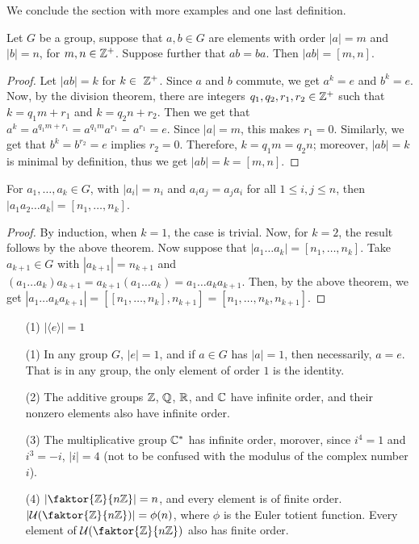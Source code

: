 We conclude the section with more examples and one last definition.

\begin{lemma}\label{1.2.5}
  Let $G$ be a group, suppose that  $a,b \in G$ are elements with
  order $|a|=m$ and  $|b|=n$, for  $m,n \in \mathbb{Z}^+$. Suppose further
  that $ab=ba$. Then  $|ab|=[m,n]$.
\end{lemma}
\begin{proof}
  Let $|ab|=k$ for $k \in \ \mathbb{Z}^+$. Since  $a$ and  $b$ commute, we get
  $a^k=e$ and  $b^k=e$. Now, by the division theorem, there are integers
  $q_1,q_2,r_1,r_2 \in \mathbb{Z}^+$ such that $k=q_1m+r_1$ and $k=q_2n+r_2$. Then we
  get that $a^k=a^{q_1m+r_1}=a^{q_1m}a^{r_1}=a^{r_1}=e$. Since $|a|=m$,
  this makes $r_1=0$. Similarly, we get that $b^k=b^{r_2}=e$ implies $r_2=0$.
  Therefore, $k=q_1m=q_2n$; moreover, $|ab|=k$ is minimal by definition,
  thus we get $|ab|=k=[m,n]$.
\end{proof}
\begin{corollary}
  For $a_1, \dots, a_k \in G$, with $|a_i|=n_i$ and $a_ia_j=a_ja_i$ for
  all  $1 \leq i,j \leq n$, then  $|a_1a_2 \dots a_k|=[n_1, \dots, n_k]$.
\end{corollary}
\begin{proof}
  By induction, when $k=1$, the case is trivial. Now, for  $k=2$, the result
  follows by the above theorem. Now suppose that $|a_1 \dots a_k|=[n_1,
  \dots, n_k]$. Take $a_{k+1} \in G$ with $|a_{k+1}|=n_{k+1}$ and $(a_1
  \dots a_k)a_{k+1}=a_{k+1}(a_1 \dots a_k)=a_1 \dots a_ka_{k+1}$. Then, by the
  above theorem, we get $|a_1 \dots a_ka_{k+1}|=[[n_1, \dots, n_k],
  n_{k+1}]=[n_1, \dots, n_k, n_{k+1}]$.
\end{proof}

\begin{example}
  \begin{enumerate}
    \item[(1)] $|\langle e \rangle|=1$
    \item[(1)] In any group $G$,  $|e|=1$, and if $a \in G$ has
      $|a|=1$, then necessarily, $a=e$. That is in any group, the only
      element of order  $1$ is the identity.

    \item[(2)] The additive groups $\mathbb{Z}$,  $\mathbb{Q}$,  $\mathbb{R}$, and  $\mathbb{C}$ have
      infinite order, and their nonzero elements also have infinite order.

    \item[(3)] The multiplicative group $\mathbb{C}^*$ has infinite order, morover,
      since $i^4=1$ and $i^3=-i$, $|i|=4$ (not to be confused with the
      modulus of the complex number $i$).

    \item[(4)] $|\faktor{\Z}{n\Z}|=n$, and every element is of finite
      order. $|\Uc{(\faktor{\Z}{n\Z})}|=\phi(n)$, where $\phi$ is the Euler
      totient function. Every element of $\Uc{(\faktor{\Z}{n\Z})}$ also has
      finite order.
  \end{enumerate}
\end{example}

